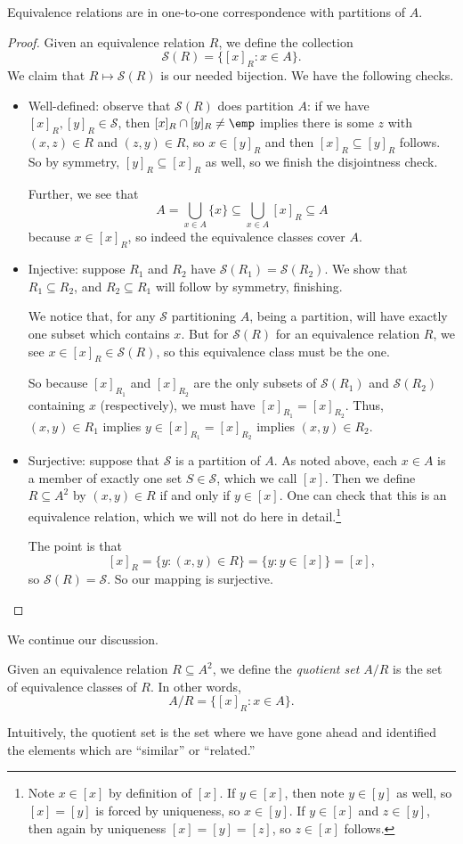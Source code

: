 \begin{lemma}
	Equivalence relations are in one-to-one correspondence with partitions of $A$.
\end{lemma}
\begin{proof}
	Given an equivalence relation $R$, we define the collection
	\[\mathcal S(R)=\{[x]_R:x\in A\}.\]
	We claim that $R\mapsto\mathcal S(R)$ is our needed bijection. We have the following checks.
	\begin{itemize}
		\item Well-defined: observe that $\mathcal S(R)$ does partition $A$: if we have $[x]_R,[y]_R\in\mathcal S$, then $[x]_R\cap[y]_R\ne\emp$ implies there is some $z$ with $(x,z)\in R$ and $(z,y)\in R$, so $x\in[y]_R$ and then $[x]_R\subseteq[y]_R$ follows. So by symmetry, $[y]_R\subseteq[x]_R$ as well, so we finish the disjointness check.
	
		Further, we see that
		\[A=\bigcup_{x\in A}\{x\}\subseteq\bigcup_{x\in A}[x]_R\subseteq A\]
		because $x\in[x]_R$, so indeed the equivalence classes cover $A$.

		\item Injective: suppose $R_1$ and $R_2$ have $\mathcal S(R_1)=\mathcal S(R_2)$. We show that $R_1\subseteq R_2$, and $R_2\subseteq R_1$ will follow by symmetry, finishing.
		
		We notice that, for any $\mathcal S$ partitioning $A$, being a partition, will have exactly one subset which contains $x$. But for $\mathcal S(R)$ for an equivalence relation $R$, we see $x\in[x]_R\in\mathcal S(R)$, so this equivalence class must be the one.

		So because $[x]_{R_1}$ and $[x]_{R_2}$ are the only subsets of $\mathcal S(R_1)$ and $\mathcal S(R_2)$ containing $x$ (respectively), we must have $[x]_{R_1}=[x]_{R_2}$. Thus, $(x,y)\in R_1$ implies $y\in[x]_{R_1}=[x]_{R_2}$ implies $(x,y)\in R_2$.

		\item Surjective: suppose that $\mathcal S$ is a partition of $A$. As noted above, each $x\in A$ is a member of exactly one set $S\in\mathcal S$, which we call $[x]$. Then we define $R\subseteq A^2$ by $(x,y)\in R$ if and only if $y\in[x]$. One can check that this is an equivalence relation, which we will not do here in detail.\footnote{Note $x\in[x]$ by definition of $[x]$. If $y\in[x]$, then note $y\in[y]$ as well, so $[x]=[y]$ is forced by uniqueness, so $x\in[y]$. If $y\in[x]$ and $z\in[y]$, then again by uniqueness $[x]=[y]=[z]$, so $z\in[x]$ follows.}

		The point is that
		\[[x]_R=\{y:(x,y)\in R\}=\{y:y\in[x]\}=[x],\]
		so $\mathcal S(R)=\mathcal S$. So our mapping is surjective.
		\qedhere
	\end{itemize}
\end{proof}
We continue our discussion.
\begin{definition}
	Given an equivalence relation $R\subseteq A^2$, we define the \textit{quotient set $A/R$} is the set of equivalence classes of $R$. In other words,
	\[A/R=\{[x]_R:x\in A\}.\]
\end{definition}
Intuitively, the quotient set is the set where we have gone ahead and identified the elements which are ``similar'' or ``related.''

